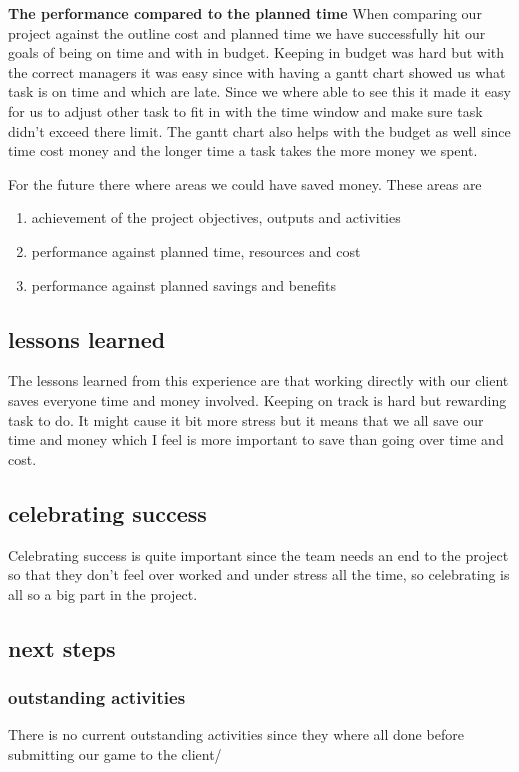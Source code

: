 \documentclass{article}
\begin{document}
\textbf{The performance compared to the planned time } 
When comparing our project against the outline cost and planned time we have successfully hit our goals of being on time and with in budget. Keeping in budget was hard but with the correct managers it was easy since with having a gantt chart showed us what task is on time and which are late. Since we where able to see this it made it easy for us to adjust other task to fit in with the time window and make sure task didn't exceed there limit. The gantt chart also helps with the budget as well since time cost money and the longer time a task takes the more money we spent.

For the future there where areas we could have saved money. These areas are
\begin{enumerate}
	\item achievement of the project objectives, outputs and activities
	\item performance against planned time, resources and cost
	\item performance against planned savings and benefits
\end{enumerate}

\subsection{lessons learned}
The lessons learned from this experience are that working directly with our client saves everyone time and money involved. Keeping on track is hard but rewarding task to do. It might cause it bit more stress  but it means that we all save our time and money which I feel is more important to save than going over time and cost.

\subsection{celebrating success}
Celebrating success is quite important since the team needs an end to the project so that they don't feel over worked and under stress all the time, so celebrating is all so a big part in the project.


\subsection{next steps}
\subsubsection{outstanding activities}
There is no current outstanding activities since they where all done before submitting our game to the client/
\end{document}
